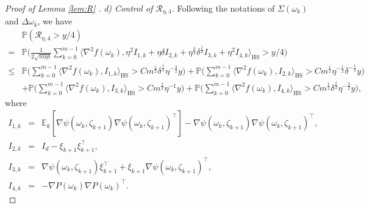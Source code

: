 \documentclass[12pt]{amsart}
\theoremstyle{definition}
\theoremstyle{remark}
\numberwithin{equation}{section}
\newcommand{\E}{\mathbb{E}}            %
\newcommand{\Ll}{\langle}
\newcommand{\Rr}{\rangle}
\newcommand{\PP}{\mathbb{P}}
\begin{document}
\begin{proof}[Proof of Lemma \ref{lem:R} ]
	\textit{d) Control of $\mathcal{R}_{\eta,4}$.} Following the notations of $\Sigma(\omega_k)$ and $\Delta\omega_k$, we have
	\begin{align}\label{e:eqR2}
		&\PP(\mathcal{R}_{\eta,4}>y/4)\\
		=& \PP\big(\frac{1}{2\sqrt{m\eta\delta}}\sum_{k=0}^{m-1}\Ll \nabla^2f(\omega_k ), 
		\eta^2I_{1,k}+\eta\delta I_{2,k}+\eta^{\frac32}\delta^{\frac12} I_{3,k}+\eta^{2} I_{4,k}
		\Rr_\mathrm{HS}>y/4
		\big)\nonumber\\
		\le& \PP\big(\sum_{k=0}^{m-1}\Ll \nabla^2f(\omega_k ), 
		I_{1,k}\Rr_\mathrm{HS}>C m^{\frac12}\delta^{\frac12}\eta^{-\frac32} y
		\big)
		+
		\PP\big(\sum_{k=0}^{m-1}\Ll \nabla^2f(\omega_k ), 
		I_{2,k}\Rr_\mathrm{HS}>C m^{\frac12}\eta^{-\frac12}\delta^{-\frac12} y
		\big)\nonumber\\
		&+
		\PP\big(\sum_{k=0}^{m-1}\Ll \nabla^2f(\omega_k ), 
		I_{3,k}\Rr_\mathrm{HS}>C m^{\frac12}\eta^{-1} y
		\big)+\PP\big(\sum_{k=0}^{m-1}\Ll \nabla^2f(\omega_k ), 
		I_{4,k}\Rr_\mathrm{HS}>C m^{\frac12}\delta^{\frac12}\eta^{-\frac32} y
		\big),\nonumber
	\end{align}
	where
	\begin{eqnarray*}
		I_{1,k}&=&\E_k[\nabla\psi(\omega_k,\zeta_{k+1})\nabla\psi(\omega_k,\zeta_{k+1})^\top]-\nabla\psi(\omega_k,\zeta_{k+1})\nabla\psi(\omega_k,\zeta_{k+1})^\top,
		\\
		I_{2,k}&=& I_d-\xi_{k+1}\xi_{k+1}^\top,\\
		I_{3,k}&=&\nabla \psi(\omega_k,\zeta_{k+1})\xi_{k+1}^\top
		+\xi_{k+1}\nabla \psi(\omega_k,\zeta_{k+1})^\top,\\
		I_{4,k}&=&-\nabla P(\omega_k)\nabla P(\omega_k)^\top.
	\end{eqnarray*}
	

\end{proof}
\end{document}
